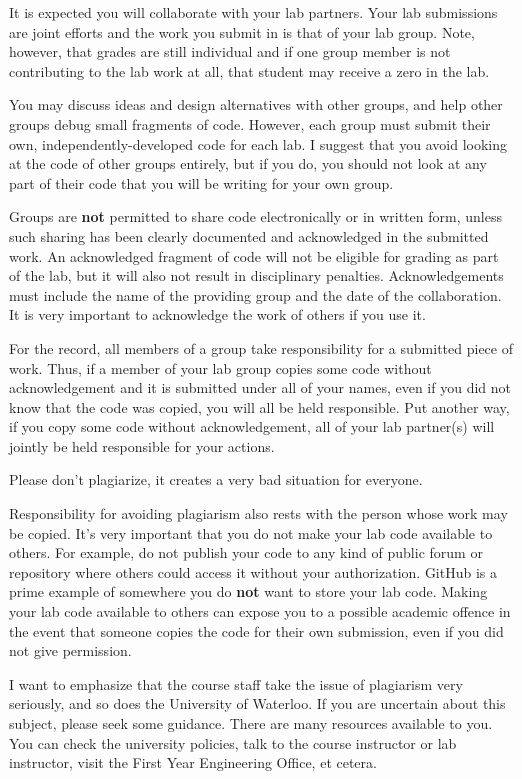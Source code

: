 \documentclass[letterpaper,10pt]{article}
\begin{document}
It is expected you will collaborate with your lab partners. Your lab submissions are joint efforts and the work you submit in is that of your lab group. Note, however, that grades are still individual and if one group member is not contributing to the lab work at all, that student may receive a zero in the lab.

You may discuss ideas and design alternatives with other groups, and help other groups debug small fragments of code. However, each group must submit their own, independently-developed code for each lab. I suggest that you avoid looking at the code of other groups entirely, but if you do, you should not look at any part of their code that you will be writing for your own group.

Groups are \textbf{not} permitted to share code electronically or in written form, unless such sharing has been clearly documented and acknowledged in the submitted work. An acknowledged fragment of code will not be eligible for grading as part of the lab, but it will also not result in disciplinary penalties. Acknowledgements must include the name of the providing group and the date of the collaboration. It is very important to acknowledge the work of others if you use it.

For the record, all members of a group take responsibility for a submitted piece of work. Thus, if a member of your lab group copies some code without acknowledgement and it is submitted under all of your names, even if you did not know that the code was copied, you will all be held responsible. Put another way, if you copy some code without acknowledgement, all of your lab partner(s) will jointly be held responsible for your actions. 

Please don't plagiarize, it creates a very bad situation for everyone.

Responsibility for avoiding plagiarism also rests with the person whose work may be copied. It's very important that you do not make your lab code available to others. For example, do not publish your code to any kind of public forum or repository where others could access it without your authorization. GitHub is a prime example of somewhere you do \textbf{not} want to store your lab code. Making your lab code available to others can expose you to a possible academic offence in the event that someone copies the code for their own submission, even if you did not give permission.

I want to emphasize that the course staff take the issue of plagiarism very seriously, and so does the University of Waterloo. If you are uncertain about this subject, please seek some guidance. There are many resources available to you. You can check the university policies, talk to the course instructor or lab instructor, visit the First Year Engineering Office, et cetera.
\end{document}
